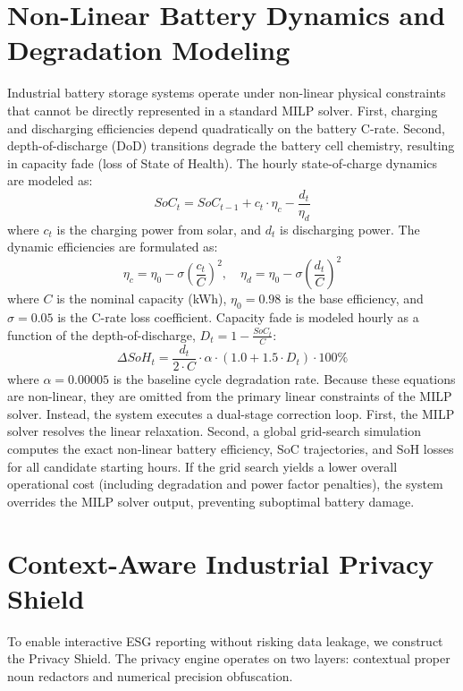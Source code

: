 \documentclass[journal]{IEEEtran}
\begin{document}
\section{Non-Linear Battery Dynamics and Degradation Modeling}
Industrial battery storage systems operate under non-linear physical constraints that cannot be directly represented in a standard MILP solver. First, charging and discharging efficiencies depend quadratically on the battery C-rate. Second, depth-of-discharge (DoD) transitions degrade the battery cell chemistry, resulting in capacity fade (loss of State of Health). The hourly state-of-charge dynamics are modeled as:
\begin{equation}
SoC_t = SoC_{t-1} + c_t \cdot \eta_c - \frac{d_t}{\eta_d}
\label{eq:soc_update}
\end{equation}
where $c_t$ is the charging power from solar, and $d_t$ is discharging power. The dynamic efficiencies are formulated as:
\begin{equation}
\eta_c = \eta_0 - \sigma \left( \frac{c_t}{C} \right)^2, \quad \eta_d = \eta_0 - \sigma \left( \frac{d_t}{C} \right)^2
\label{eq:efficiencies}
\end{equation}
where $C$ is the nominal capacity (kWh), $\eta_0 = 0.98$ is the base efficiency, and $\sigma = 0.05$ is the C-rate loss coefficient. Capacity fade is modeled hourly as a function of the depth-of-discharge, $D_t = 1 - \frac{SoC_t}{C}$:
\begin{equation}
\Delta SoH_t = \frac{d_t}{2 \cdot C} \cdot \alpha \cdot ( 1.0 + 1.5 \cdot D_t ) \cdot 100\%
\label{eq:soh_degradation}
\end{equation}
where $\alpha = 0.00005$ is the baseline cycle degradation rate. Because these equations are non-linear, they are omitted from the primary linear constraints of the MILP solver. Instead, the system executes a dual-stage correction loop. First, the MILP solver resolves the linear relaxation. Second, a global grid-search simulation computes the exact non-linear battery efficiency, SoC trajectories, and SoH losses for all candidate starting hours. If the grid search yields a lower overall operational cost (including degradation and power factor penalties), the system overrides the MILP solver output, preventing suboptimal battery damage.

\section{Context-Aware Industrial Privacy Shield}
To enable interactive ESG reporting without risking data leakage, we construct the Privacy Shield. The privacy engine operates on two layers: contextual proper noun redactors and numerical precision obfuscation.
\end{document}
